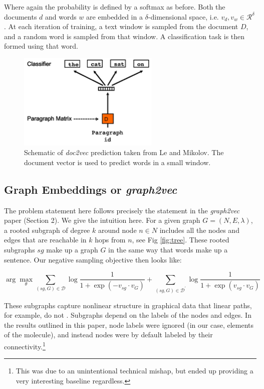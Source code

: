 Where again the probability is defined by a softmax as before. Both the documents $d$ and words $w$ are embedded in a $\delta$-dimensional space, i.e. $v_d, v_w \in \mathcal{R}^\delta$. At each iteration of training, a text window is sampled from the document $D$, and a random word is sampled from that window. A classification task is then formed using that word.

\begin{figure}
\centering
\includegraphics[width=0.6\textwidth]{figs/paragraph2vec.png}
\caption{Schematic of \textit{doc2vec} prediction taken from Le and Mikolov\cite{Le2014}. The document vector is used to predict words in a small window.}
\label{doc2vec}
\end{figure}


\subsection{Graph Embeddings or \textit{graph2vec}}

The problem statement here follows precisely the statement in the \textit{graph2vec} paper \cite{Narayanan} (Section 2). We give the intuition here. For a given graph $G = (N, E, \lambda)$, a rooted subgraph of degree $k$ around node $n \in N$ includes all the nodes and edges that are reachable in $k$ hops from $n$, see Fig \ref{fig:tree}. These rooted subgraphs $sg$ make up a graph $G$ in the same way that words make up a sentence. Our negative sampling objective then looks like:

$$
\arg\max_\theta
\sum_{(sg, G) \in \mathcal{D}}
    \log \dfrac{1}{1 + \exp{(-v_{sg} \cdot v_G)}}
+ \sum_{(sg, G) \in \mathcal{D^\prime}}
    \log \dfrac{1}{1 + \exp{(v_{sg} \cdot v_G)}}
$$

These subgraphs capture nonlinear structure in graphical data that linear paths, for example, do not \cite{SchweitzerPASCAL2011}. Subgraphs depend on the labels of the nodes and edges. In the results outlined in this paper, node labels were ignored (in our case, elements of the molecule), and instead nodes were by default labeled by their connectivity.\footnote{This was due to an unintentional technical mishap, but ended up providing a very interesting baseline regardless.}

